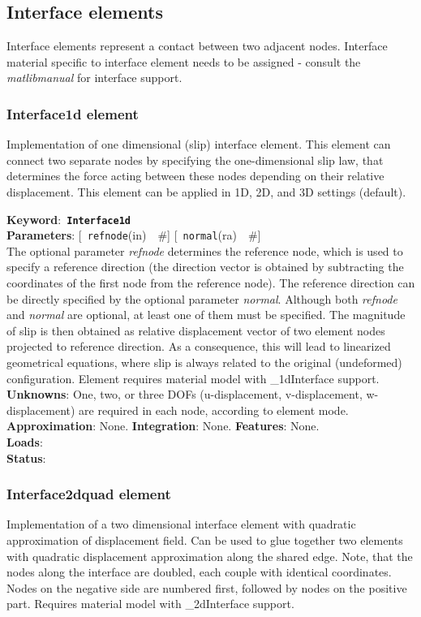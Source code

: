 \documentclass[a4paper]{article}
\newcommand{\descitem}[1]{{\noindent \bf #1}:}
\newcommand{\elemkeyword}[1]{\descitem{Keyword}~{\bf \texttt{#1}}}
\newcommand{\elemparam}[2]{{{\texttt{#1}\tiny (#2)}~~\#}}
\newcommand{\optelemparam}[2]{{[~\elemparam{#1}{#2}]}}
\newcommand{\param}[1]{{\em #1}}
\begin{document}
\subsection{Interface elements}

Interface elements represent a contact between two adjacent nodes. Interface material specific to interface element needs to be assigned - consult the {\it matlibmanual} for interface support. 

\subsubsection{Interface1d element}
Implementation of one dimensional (slip) interface element. 
This element can connect two separate nodes by specifying the
one-dimensional slip law, that determines the force acting between
these nodes depending on their relative displacement. This element can
be applied in 1D, 2D, and 3D settings (default).

\elemkeyword{Interface1d}\\
\descitem{Parameters} \optelemparam{refnode}{in} \optelemparam{normal}{ra}\\
The optional parameter \param{refnode} determines the reference node, which is used to
specify a reference direction (the direction vector is obtained by
subtracting the coordinates of the first node from the reference node). The reference direction can be directly specified by the optional parameter \param{normal}. Although both \param{refnode} and \param{normal} are optional, at least one of them must be specified.
The magnitude of slip is then obtained as relative displacement vector
of two element nodes projected to reference direction. As a
consequence, this will lead to linearized geometrical equations, where
slip is always related to the original (undeformed) configuration.
Element requires material model with \_1dInterface support.
\descitem{Unknowns}
One, two, or three DOFs (u-displacement, v-displacement,
w-displacement) are required in each node, according to element mode.\\
\descitem{Approximation} None.
\descitem{Integration} None.
\descitem{Features} None.\\
\descitem{Loads} \\
\descitem{Status} 

\subsubsection{Interface2dquad element}
Implementation of a two dimensional interface element with quadratic
approximation of displacement field. Can be used to glue together two elements with quadratic displacement approximation along the shared edge. Note, that the nodes along the interface are doubled, each couple with identical coordinates. Nodes on the negative side are numbered first, followed by nodes on the positive part. Requires material model with \_2dInterface support. 
\end{document}
